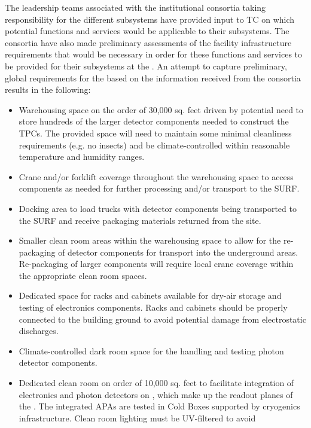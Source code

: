 The leadership teams associated with the  institutional
consortia taking responsibility for the different 
subsystems have provided input to TC on which potential 
functions and services would be applicable to their subsystems.  The
consortia have also made preliminary assessments of the facility
infrastructure requirements that would be necessary in order for these
functions and services to be provided for their subsystems at the
.  An attempt to capture preliminary, global requirements
for the  based on the information received from the
consortia results in the following:
\begin{itemize}
  \item Warehousing space on the order of 30,000 sq. feet driven by
    potential need to store hundreds of the larger detector components
    needed to construct the TPCs.  The provided space will need to
    maintain some minimal cleanliness requirements (e.g. no insects)
    and be climate-controlled within reasonable temperature and
    humidity ranges.
  \item Crane and/or forklift coverage throughout the warehousing
    space to access components as needed for further processing and/or
    transport to the SURF.
  \item Docking area to load trucks with detector components being
    transported to the SURF and receive packaging materials
    returned from the site.
  \item Smaller clean room areas within the warehousing space to
    allow for the re-packaging of detector components for transport
    into the underground areas.  Re-packaging of larger components
    will require local crane coverage within the appropriate clean room
    spaces.
  \item Dedicated space for racks and cabinets available for dry-air
    storage and testing of electronics components.  Racks and cabinets
    should be properly connected to the building ground to avoid
    potential damage from electrostatic discharges.
  \item Climate-controlled dark room space for the handling and
    testing photon detector components.
  \item Dedicated clean room on order of 10,000 sq. feet to facilitate
    integration of electronics and photon detectors on ,
    which make up the readout planes of the  . The
    integrated APAs are tested in Cold Boxes supported by cryogenics
    infrastructure.  Clean room lighting must be UV-filtered to avoid

\end{itemize}
